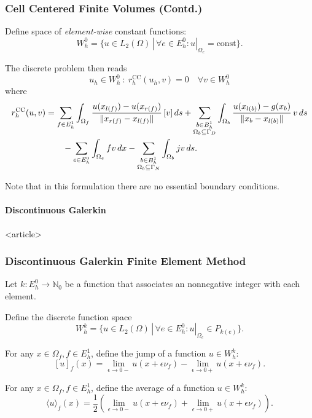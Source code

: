 
\begin{frame}
\frametitle<presentation>{Cell Centered Finite Volumes (Contd.)}
Define space of \textit{element-wise} constant functions:
\begin{equation*}
W_h^0 = \{  u\in L_2(\Omega) \,|\, \forall e\in E^0_h : u|_{\Omega_e} =
\text{const} \} .
\end{equation*}

The discrete problem then reads
\begin{equation*}
u_h\in W_h^0 \ : \ r_h^\text{CC}(u_h,v) = 0 \quad \forall v\in W^0_h
\end{equation*}
where
\begin{equation*}
\begin{split}
r_h^\text{CC}(u,v) &= \sum_{f\in E^1_h} \int_{\Omega_f}
\frac{u(x_{l(f)})-u(x_{r(f)})}{\|x_{r(f)}-x_{l(f)}
\|}\,[v]\,d s
+ \sum_{\substack{b\in B^1_h\\ \Omega_b\subseteq\Gamma_D}} \int_{\Omega_b}
\frac{u(x_{l(b)})-g(x_b)}{\|x_{b}-x_{l(b)}\|}\, v \,d s \\
& \qquad - \sum_{e\in E_h^0} \int_{\Omega_e} fv \,d x -
\sum_{\substack{b\in B^1_h\\ \Omega_b\subseteq\Gamma_N}}
\int_{\Omega_b} j v \,d s .
\end{split}
\end{equation*}

Note that in this formulation there are no essential boundary
conditions. 
\end{frame}

\paragraph{Discontinuous Galerkin}

\begin{frame}<article>
\frametitle<presentation>{Discontinuous Galerkin Finite Element
Method}
Let $k : E^0_h \to \mathbb{N}_0$ be a function that associates an
nonnegative integer with each element.

Define the discrete function space
\begin{equation*}
W_h^k = \{u\in L_2(\Omega) \,|\, \forall e\in E^0_h : u|_{\Omega_e} \in P_{k(e)}\}.
\end{equation*}

For any $x\in\Omega_f, f\in E_h^1$, define the jump of a function
$u\in W_h^k$:
\begin{equation*}
\label{Eq:Jump}
[u]_f(x) = \lim\limits_{\epsilon\to 0-} u(x+\epsilon\nu_f) - 
\lim\limits_{\epsilon\to 0+} u(x+\epsilon\nu_f).
\end{equation*}

For any $x\in\Omega_f, f\in E_h^1$, define the average of a function
$u\in W_h^k$:
\begin{equation*}
\label{Eq:Average}
\langle u\rangle_f(x) = \frac{1}{2}\left(\lim\limits_{\epsilon\to 0-} u(x+\epsilon
\nu_f) +  \lim\limits_{\epsilon\to 0+} u(x+\epsilon
\nu_f)\right ).
\end{equation*}

\end{frame}


